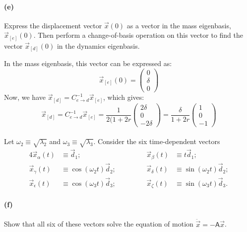 \documentclass{article}
\begin{document}
\paragraph{(e)}
Express the displacement vector $\vec{x}(0)$ as a vector in the mass eigenbasis, $\vec{x}_{[e]}(0)$.  Then perform a change-of-basis operation on this vector to find the vector
$\vec{x}_{[d]}(0)$ in the dynamics eigenbasis.  

\begin{solution}
	In the mass eigenbasis, this vector can be expressed as:
	\[
		\vec x_{[e]} (0) = \begin{pmatrix} 0 \\ \delta \\ 0 \end{pmatrix} 
	\] 
	Now, we have $\vec x_{[d]} = C^{-1}_{e \to d} \vec x_{[e]}$, which gives:
	\[
		\vec x_{[d]} = C^{-1}_{e \to d} \vec x_{[e]} = \frac{1}{2(1 + 2r}\begin{pmatrix} 2\delta \\ 0 \\ -2\delta \end{pmatrix} 
		= \frac{\delta}{1+ 2r}\begin{pmatrix} 1 \\0\\-1 \end{pmatrix} 
	\] 
\end{solution}

\phline
\paragraph{}
Let $\omega_{2} \equiv \sqrt{\lambda_{2}}$ and $\omega_{3} \equiv \sqrt{\lambda_{3}}$.  Consider the six time-dependent vectors
	\begin{alignat*}{4}
		\vec{x}_{\alpha}(t) 		&\equiv 	\vec{d}_{1};	&&\qquad&
		\vec{x}_{\beta}(t) 		&\equiv 	t\vec{d}_{1};\\
		\vec{x}_{\gamma}(t)		&\equiv	\cos(\omega_{2}t)\vec{d}_{2};	&&\qquad&
		\vec{x}_{\delta}(t)		&\equiv	\sin(\omega_{2}t)\vec{d}_{2};	\\
		\vec{x}_{\epsilon}(t)		&\equiv	\cos(\omega_{3}t)\vec{d}_{3};	&&\qquad&
		\vec{x}_{\zeta}(t)		&\equiv	\sin(\omega_{3}t)\vec{d}_{3}.
	\end{alignat*}

\paragraph{(f)}
Show that all six of these vectors solve the equation of motion $\ddot{\vec{x}} = -\mathsf{A}\vec{x}$.\\
\end{document}
